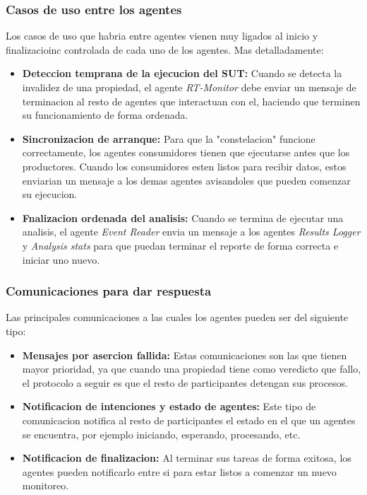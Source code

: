 \documentclass[12pt, letterpaper]{article}
\begin{document}
 \subsubsection{Casos de uso entre los agentes}
  Los casos de uso que habria entre agentes vienen muy ligados al inicio y finalizacioinc controlada de cada uno de los agentes. Mas detalladamente:
  \begin{itemize}
    \item \textbf{Deteccion temprana de la ejecucion del SUT: }Cuando se detecta la invalidez de una propiedad, el agente \emph{RT-Monitor} debe enviar un mensaje de terminacion al resto de agentes que interactuan con el, haciendo que terminen su funcionamiento de forma ordenada.
    \item \textbf{Sincronizacion de arranque: } Para que la "constelacion" funcione correctamente, los agentes consumidores tienen que ejecutarse antes que los productores. Cuando los consumidores esten listos para recibir datos, estos enviarian un mensaje a los demas agentes avisandoles que pueden comenzar su ejecucion. 
    \item \textbf{Fnalizacion ordenada del analisis: } Cuando se termina de ejecutar una analisis, el agente \emph{Event Reader} envia un mensaje a los agentes \emph{Results Logger} y \emph{Analysis stats} para que puedan terminar el reporte de forma correcta e iniciar uno nuevo.
  \end{itemize}

  \subsubsection{Comunicaciones para dar respuesta}
    Las principales comunicaciones a las cuales los agentes pueden ser del siguiente tipo:
   \begin{itemize}
    \item \textbf{Mensajes por asercion fallida: }Estas comunicaciones son las que tienen mayor prioridad, ya que cuando una propiedad tiene como veredicto que fallo, el protocolo a seguir es que el resto de participantes detengan sus procesos. 
    \item \textbf{Notificacion de intenciones y estado de agentes: }Este tipo de comunicacion notifica al resto de participantes el estado en el que un agentes se encuentra, por ejemplo iniciando, esperando, procesando, etc. 
    \item \textbf{Notificacion de finalizacion: }Al terminar sus tareas de forma exitosa, los agentes pueden notificarlo entre si para estar listos a comenzar un nuevo monitoreo.
   \end{itemize}
\end{document}
